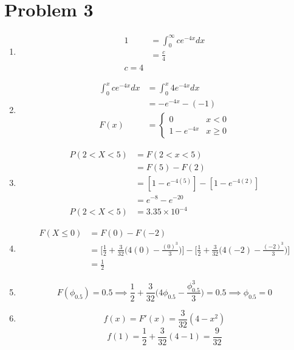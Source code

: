 \documentclass[13pt]{article}
\begin{document}
\section*{Problem 3}
\begin{enumerate}[label=(\alph*)]
\item
  \begin{align*}
    1 &= \int_{0}^{\infty} ce^{-4x}dx \\
      &= \frac{c}{4} \\
    c = 4
  \end{align*}
  
\item
  \begin{align*}
    \int_{0}^{x} ce^{-4x}dx &= \int_{0}^{x} 4e^{-4x}dx \\
                            &= -e^{-4x} - (-1) \\
    F(x) &= 
           \begin{cases}
             0 & x < 0 \\
             1 - e^{-4x} & x \geq 0
           \end{cases}
  \end{align*}

\item
  \begin{align*}
    P(2 < X < 5) &= F(2 < x < 5) \\
                 &= F(5) - F(2) \\
                 &= [1 - e^{-4(5)}] - [1 - e^{-4(2)}] \\
                 &= e^{-8} - e^{-20} \\
    P(2 < X < 5) &= 3.35 \times 10^{-4}
  \end{align*}

\item
  \begin{align*}
    F(X \leq 0) &= F(0) - F(-2) \\
                &= \bigg[\frac{1}{2} + \frac{3}{32} \bigg( 4(0) -
                  \frac{(0)^3}{3} \bigg)\bigg] - \bigg[\frac{1}{2} + \frac{3}{32}
                  \bigg( 4(-2) - \frac{(-2)^3}{3} \bigg)\bigg] \\ 
                &= \frac{1}{2}
  \end{align*}

\item \[F(\phi_{0.5}) = 0.5 \implies \frac{1}{2} + \frac{3}{32}
    \bigg( 4\phi_{0.5} - \frac{\phi_{0.5}^{3}}{3} \bigg) = 0.5 \implies \phi_{0.5} = 0\]
  
\item \[f(x) = F'(x) = \frac{3}{32} (4 - x^2) \]
  \[f(1) = \frac{1}{2} + \frac{3}{32}(4 - 1) = \frac{9}{32}\]
\end{enumerate}
\end{document}

